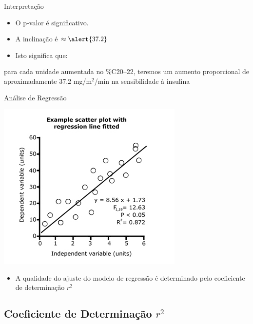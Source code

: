 \documentclass{beamer}
\begin{document}
\begin{frame}{Interpretação}
  \begin{itemize}
  \item O p-valor é significativo.
  \item A inclinação é $\approx \alert{37.2}$
  \item Isto significa que:
  \end{itemize}
  \begin{block}{}
    para cada unidade aumentada no \%C20--22, teremos um aumento proporcional de aproximadamente 37.2 mg/m$^2$/min na sensibilidade à insulina
  \end{block}
\end{frame}

\begin{frame}{Análise de Regressão}
  \begin{center}
      \includegraphics[height=0.6\textheight]{Cap18-19/residuos2}
  \end{center}

  \begin{itemize}
  \item A qualidade do ajuste do modelo de regressão é determinado
    pelo \alert{coeficiente de determinação} $r^2$
  \end{itemize}
\end{frame}


\subsection[$R^2$]{Coeficiente de Determinação $r^2$}
\end{document}
